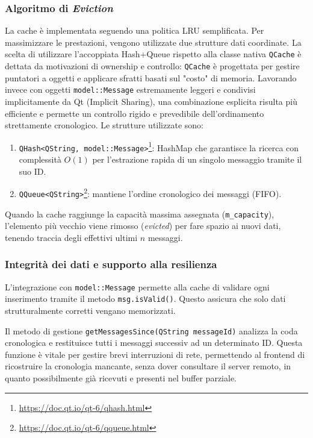 \documentclass[a4paper, 11pt, twoside]{report}
\begin{document}
\newpage

\subsubsection{Algoritmo di \textit{Eviction}}

La cache è implementata seguendo una politica \gls{LRU} semplificata. Per massimizzare le prestazioni, vengono utilizzate due strutture dati coordinate.
La scelta di utilizzare l'accoppiata Hash+Queue rispetto alla classe nativa \texttt{QCache} è dettata da motivazioni di ownership e controllo: 
\texttt{QCache} è progettata per gestire puntatori a oggetti e applicare sfratti basati sul "costo" di memoria. Lavorando invece con oggetti 
\texttt{model::Message} estremamente leggeri e condivisi implicitamente da Qt (Implicit Sharing), una combinazione esplicita risulta più efficiente
e permette un controllo rigido e prevedibile dell'ordinamento strettamente cronologico.
Le strutture utilizzate sono:

\begin{enumerate}
    \item\texttt{QHash<QString, model::Message>}\footnote{\url{https://doc.qt.io/qt-6/qhash.html}}: HashMap che
        garantisce la ricerca con complessità $O(1)$ per l'estrazione rapida di un singolo messaggio tramite il suo ID.

    \item\texttt{QQueue<QString>}\footnote{\url{https://doc.qt.io/qt-6/qqueue.html}}: mantiene l'ordine cronologico dei
        messaggi (\gls{FIFO}).
\end{enumerate}

Quando la cache raggiunge la capacità massima assegnata (\texttt{m\_capacity}), l'elemento più vecchio viene rimosso
(\textit{evicted}) per fare spazio ai nuovi dati, tenendo traccia degli effettivi ultimi $n$ messaggi.

\subsubsection{Integrità dei dati e supporto alla resilienza}

L'integrazione con \texttt{model::Message} permette alla cache di validare ogni inserimento tramite il metodo
\texttt{msg.isValid()}. Questo assicura che solo dati strutturalmente corretti vengano memorizzati.

Il metodo di gestione \texttt{getMessagesSince(QString messageId)} analizza la coda cronologica e restituisce tutti i
messaggi successiv ad un determinato ID. Questa funzione è vitale per gestire brevi interruzioni di rete, permettendo
al frontend di ricostruire la cronologia mancante, senza dover consultare il server remoto, in quanto possibilmente
già ricevuti e presenti nel buffer parziale.
\end{document}
